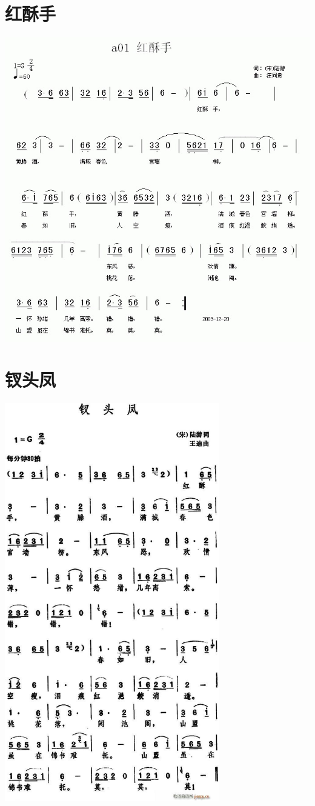 \documentclass[cn,pad,twocol]{elegantbook}
\begin{document}
\section{红酥手}    \includegraphics[width=\textwidth]{dongxiao/20200808-红酥手-陆游.jpg}
\section{钗头凤}    \includegraphics[width=0.7\textwidth]{dongxiao/20200808-钗头凤-陆游.jpg}                             
\end{document}

